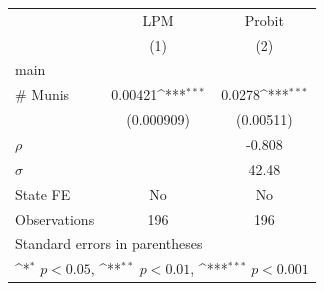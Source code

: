 {
\def\sym#1{\ifmmode^{#1}\else\(^{#1}\)\fi}
\begin{tabular}{l*{2}{c}}
\toprule
                    &\multicolumn{1}{c}{LPM}&\multicolumn{1}{c}{Probit}\\
                    &\multicolumn{1}{c}{(1)}         &\multicolumn{1}{c}{(2)}         \\
\midrule
main                &                     &                     \\
\# Munis            &     0.00421\sym{***}&      0.0278\sym{***}\\
                    &  (0.000909)         &   (0.00511)         \\
\midrule
\(\rho\)            &                     &      -0.808         \\
\(\sigma\)          &                     &       42.48         \\
State FE            &          No         &          No         \\
Observations        &         196         &         196         \\
\bottomrule
\multicolumn{3}{l}{\footnotesize Standard errors in parentheses}\\
\multicolumn{3}{l}{\footnotesize \sym{*} \(p<0.05\), \sym{**} \(p<0.01\), \sym{***} \(p<0.001\)}\\
\end{tabular}
}
